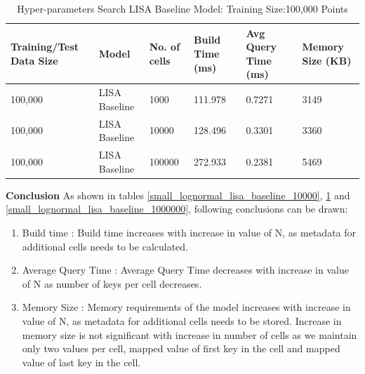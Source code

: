 \begin{table}[ht]
	\centering
	\begin{tabular}{||p{}<{\centering}|p{}<{\centering}| p{}<{\centering}|p{}<{\centering}|p{}<{\centering}|p{}<{\centering}||}
		\hline
		Training/Test Data Size & Model & No. of cells & Build Time (ms) & Avg Query Time (ms) & Memory Size (KB)\\ [0.5ex] 
		\hline
		\hline
		
		100,000& LISA Baseline & 1000 & 111.978 & 0.7271 & 3149\\
		\hline
		100,000& LISA Baseline & 10000 & 128.496 & 0.3301 & 3360\\
		\hline
		100,000& LISA Baseline & 100000 & 272.933 & 0.2381 & 5469\\
		\hline
		\hline
	\end{tabular}
   \caption{Hyper-parameters Search LISA Baseline Model: Training Size:100,000 Points}
    \label{small_lognormal_lisa_baseline_100000}
\end{table}

\textbf{Conclusion} As shown in tables \ref{small_lognormal_lisa_baseline_10000}, \ref{small_lognormal_lisa_baseline_100000} and \ref{small_lognormal_lisa_baseline_1000000}, following conclusions can be drawn:
\begin{enumerate}
	\item Build time : Build time increases with increase in value of N, as metadata for additional cells needs to be calculated. 
	\item Average Query Time :  Average Query Time decreases with increase in value of N as number of keys per cell decreases.
	\item Memory Size :  Memory requirements of the model increases with increase in value of N, as metadata for additional cells needs to be stored. Increase  in memory size is not significant with increase in number of cells as we maintain only two values per cell, mapped value of first key in the cell and mapped value of last key in the cell.
\end{enumerate}

